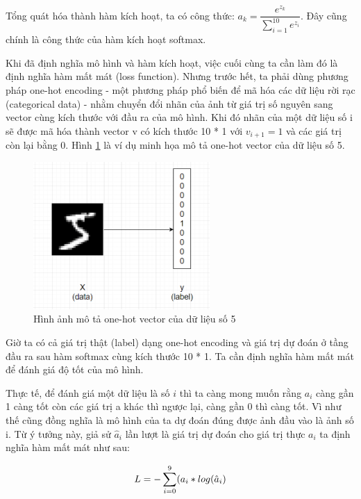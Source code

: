 \documentclass[a4paper]{article}
\begin{document}
Tổng quát hóa thành hàm kích hoạt, ta có công thức: $a_{k} = \dfrac{e^{z_{k}}}{\sum^{10}_{i=1}e^{z_{i}}}$. Đây cũng chính là công thức của hàm kích hoạt softmax.

Khi đã định nghĩa mô hình và hàm kích hoạt, việc cuối cùng ta cần làm đó là định nghĩa hàm mất mát (loss function). Nhưng trước hết, ta phải dùng phương pháp one-hot encoding - một phương pháp phổ biến để mã hóa các dữ liệu rời rạc (categorical data) - nhằm chuyển đổi nhãn của ảnh từ giá trị số nguyên sang vector cùng kích thước với đầu ra của mô hình. Khi đó nhãn của một dữ liệu số i sẽ được mã hóa thành vector v có kích thước 10 * 1 với $v_{i+1}= 1$ và các giá trị còn lại bằng 0. Hình \ref{fig:one hot} là ví dụ minh họa mô tả one-hot vector của dữ liệu số 5.

\begin{figure}
    \centering
    \includegraphics[width=0.6\textwidth]{image/one-hot.png}
    \caption{Hình ảnh mô tả one-hot vector của dữ liệu số 5}
    \label{fig:one hot}
\end{figure}

Giờ ta có cả giá trị thật (label) dạng one-hot encoding và giá trị dự đoán ở tầng đầu ra sau hàm softmax  cùng kích thước 10 * 1. Ta cần định nghĩa hàm mất mát để đánh giá độ tốt của mô hình.

Thực tế, để đánh giá một dữ liệu là số $i$ thì ta càng mong muốn rằng $a_{i}$ càng gần 1 càng tốt còn các giá trị a khác thì ngược lại, càng gần 0 thì càng tốt. Vì như thế cũng đồng nghĩa là mô hình của ta dự đoán đúng được ảnh đầu vào là ảnh số i. Từ ý tưởng này, giả sử $\hat{a}_i$ lần lượt là giá trị dự đoán cho giá trị thực $a_{i}$  ta định nghĩa hàm mất mát như sau:
 
\begin{equation*}
    \centering
    L = - \sum_{i=0}^{9}(a_{i} * log (\hat{a}_{i})
\end{equation*}
\end{document}
